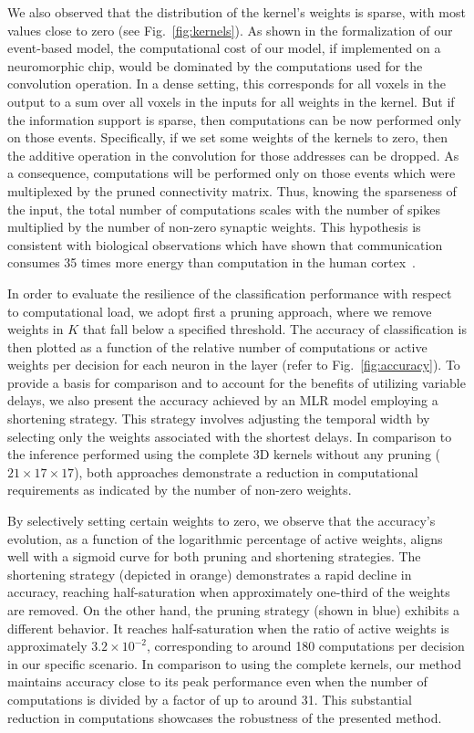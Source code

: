\documentclass[default]{sn-jnl}%
\theoremstyle{thmstyleone}%
\theoremstyle{thmstyletwo}%
\theoremstyle{thmstylethree}%
\newcommand{\seeFig}[1]{see Fig.~\ref{fig:#1}}%
\newcommand{\kernel}{K} %
\begin{document}
We also observed that the distribution of the kernel's weights is sparse, with most values close to zero (\seeFig{kernels}). As shown in the formalization of our event-based model, the computational cost of our model, if implemented on a neuromorphic chip, would be dominated by the computations used for the convolution operation. In a dense setting, this corresponds for all voxels in the output to a sum over all voxels in the inputs for all weights in the kernel. But if the information support is sparse, then computations can be now performed only on those events. Specifically, if we set some weights of the kernels to zero, then the additive operation in the convolution for those addresses can be dropped. As a consequence, computations will be performed only on those events which were multiplexed by the pruned connectivity matrix. Thus, knowing the sparseness of the input, the total number of computations scales with the number of spikes multiplied by the number of non-zero synaptic weights. This hypothesis is consistent with biological observations which have shown that communication consumes 35 times more energy than computation in the human cortex~\citep{Levy2021}.

In order to evaluate the resilience of the classification performance with respect to computational load, we adopt first a pruning approach, where we remove weights in $\kernel$ that fall below a specified threshold. The accuracy of classification is then plotted as a function of the relative number of computations or active weights per decision for each neuron in the layer (refer to Fig.~\ref{fig:accuracy}). To provide a basis for comparison and to account for the benefits of utilizing variable delays, we also present the accuracy achieved by an MLR model employing a shortening strategy. This strategy involves adjusting the temporal width by selecting only the weights associated with the shortest delays. In comparison to the inference performed using the complete 3D kernels without any pruning ($21\times17\times17$), both approaches demonstrate a reduction in computational requirements as indicated by the number of non-zero weights.

By selectively setting certain weights to zero, we observe that the accuracy's evolution, as a function of the logarithmic percentage of active weights, aligns well with a sigmoid curve for both pruning and shortening strategies. The shortening strategy (depicted in orange) demonstrates a rapid decline in accuracy, reaching half-saturation when approximately one-third of the weights are removed. On the other hand, the pruning strategy (shown in blue) exhibits a different behavior. It reaches half-saturation when the ratio of active weights is approximately $3.2\times 10^{-2}$, corresponding to around 180 computations per decision in our specific scenario. In comparison to using the complete kernels, our method maintains accuracy close to its peak performance even when the number of computations is divided by a factor of up to around 31. This substantial reduction in computations showcases the robustness of the presented method.
%
%
%
\end{document}
